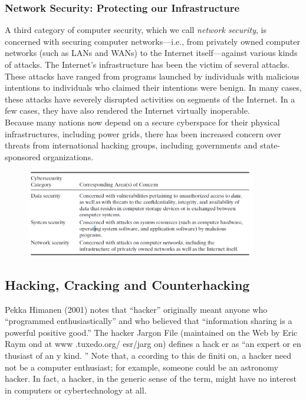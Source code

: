 \documentclass[12pt]{article}
\theoremstyle{definition}
\begin{document}
\subsubsection{Network Security: Protecting our Infrastructure}
A third category of computer security, which we call \textit{network security}, is concerned with
securing computer networks—i.e., from privately owned computer networks (such as
LANs and WANs) to the Internet itself—against various kinds of attacks. The Internet’s
infrastructure has been the victim of several attacks. These attacks have ranged from
programs launched by individuals with malicious intentions to individuals who claimed
their intentions were benign. In many cases, these attacks have severely disrupted
activities on segments of the Internet. In a few cases, they have also rendered the
Internet virtually inoperable.\\
Because many nations now depend on a secure cyberspace for their physical
infrastructures, including power grids, there has been increased concern over threats
from international hacking groups, including governments and state-sponsored organizations.\\
\begin{figure}[h]
\centering
\includegraphics[width=0.9\textwidth]{9.png}
\end{figure}
\subsection{Hacking, Cracking and Counterhacking}
Pekka Himanen (2001) notes that “hacker” originally meant anyone who “programmed enthusiastically” and who believed that
“information sharing is a powerful positive good.” The hacker Jargon File (maintained
on the Web by Eric Raym ond at www .tuxedo.org/ esr/jarg on) defines a hack er as “an
expert or en thusiast of an y kind. ” Note that, a ccording to this de finiti on, a hacker need
not be a computer enthusiast; for example, someone could be an astronomy hacker. In
fact, a hacker, in the generic sense of the term, might have no interest in computers or
cybertechnology at all.
\end{document}
